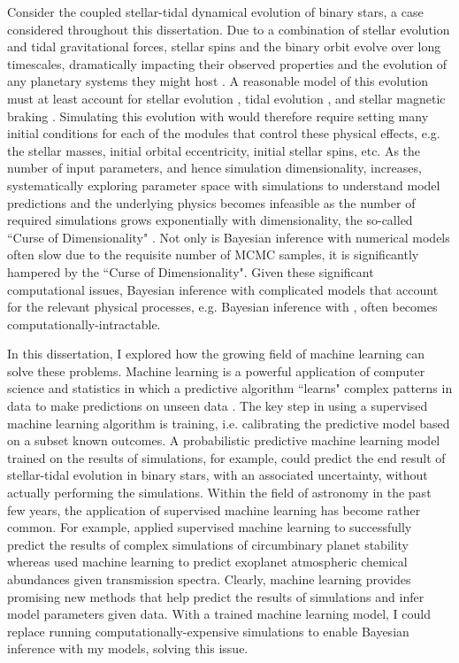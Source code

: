 Consider the coupled stellar-tidal dynamical evolution of binary stars, a case considered throughout this dissertation. Due to a combination of stellar evolution and tidal gravitational forces, stellar spins and the binary orbit evolve over long timescales, dramatically impacting their observed properties and the evolution of any planetary systems they might host \citep[for example, see][for how tides circularize binary orbits over time]{Zahn1989,Meibom2005}. A reasonable model of this evolution must at least account for stellar evolution \citep[e.g.][]{Baraffe2015}, tidal evolution \citep[e.g.][]{Hut1981,FerrazMello2008,Leconte2010}, and stellar magnetic braking \citep[e.g.][]{Matt2015}. Simulating this evolution with \vplanet would therefore require setting many initial conditions for each of the modules that control these physical effects, e.g. the stellar masses, initial orbital eccentricity, initial stellar spins, etc.  As the number of input parameters, and hence simulation dimensionality, increases, systematically exploring parameter space with simulations to understand model predictions and the underlying physics becomes infeasible as the number of required simulations grows exponentially with dimensionality, the so-called ``Curse of Dimensionality" \citep{Bellman1957}.  Not only is Bayesian inference with numerical models often slow due to the requisite number of MCMC samples, it is significantly hampered by the ``Curse of Dimensionality". Given these significant computational issues, Bayesian inference with complicated models that account for the relevant physical processes, e.g. Bayesian inference with \vplanet, often becomes computationally-intractable.

In this dissertation, I explored how the growing field of machine learning can solve these problems. Machine learning is a powerful application of computer science and statistics in which a predictive algorithm ``learns" complex patterns in data to make predictions on unseen data \citep[see][for a thorough review]{Murphy2012}. The key step in using a supervised machine learning algorithm is training, i.e. calibrating the predictive model based on a subset known outcomes.  A probabilistic predictive machine learning model trained on the results of \vplanet simulations, for example, could predict the end result of stellar-tidal evolution in binary stars, with an associated uncertainty, without actually performing the simulations.  Within the field of astronomy in the past few years, the application of supervised machine learning has become rather common. For example, \citet{Lam2018} applied supervised machine learning to successfully predict the results of complex simulations of circumbinary planet stability whereas \citet{Waldmann2016} used machine learning to predict exoplanet atmospheric chemical abundances given transmission spectra. Clearly, machine learning provides promising new methods that help predict the results of simulations and infer model parameters given data. With a trained machine learning model, I could replace running computationally-expensive simulations to enable Bayesian inference with my models, solving this issue. 

